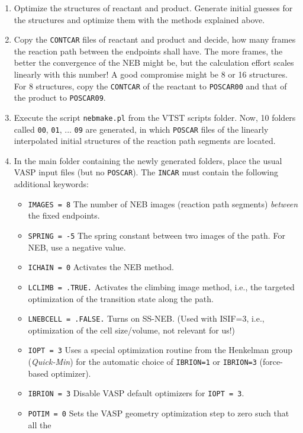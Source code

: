 \documentclass[a4paper,11pt]{article}
\begin{document}
\begin{enumerate}
 \item Optimize the structures of reactant and product. Generate initial guesses for the structures 
 and optimize them with the methods explained above.
 \item Copy the \texttt{CONTCAR} files of reactant and product and decide, how many frames the 
 reaction path between the endpoints shall have. The more frames, the better the convergence of the NEB might be, but the 
 calculation effort scales linearly with this number! A good compromise might be 8 or 16 structures.
 For 8 structures, copy the \texttt{CONTCAR} of the reactant to \texttt{POSCAR00} and that of the product 
 to \texttt{POSCAR09}. 
 \item Execute the script \texttt{nebmake.pl} from the VTST scripts folder. Now, 10 folders called 
 \texttt{00}, \texttt{01}, ... \texttt{09} are generated, in which \texttt{POSCAR} files of the linearly interpolated 
 initial structures of the reaction path segments are located.
 \item In the main folder containing the newly generated folders, place the usual VASP input files 
 (but no \texttt{POSCAR}).
 The \texttt{INCAR} must contain the following additional keywords:
 \begin{itemize}
  \item \texttt{IMAGES = 8} The number of NEB images (reaction path segments) \textit{between} the 
  fixed endpoints.
  \item \texttt{SPRING = -5} The spring constant between two images of the path. For NEB, use 
  a negative value.
  \item \texttt{ICHAIN = 0} Activates the NEB method.
  \item \texttt{LCLIMB = .TRUE.} Activates the climbing image method, i.e., the targeted 
  optimization of the transition state along the path.
  \item \texttt{LNEBCELL = .FALSE.} Turns on SS-NEB. (Used with ISIF=3, i.e., optimization of the 
  cell size/volume, not relevant for us!)
  \item \texttt{IOPT = 3} Uses a special optimization routine from the Henkelman group (\textit{Quick-Min}) for the 
  automatic choice of \texttt{IBRION=1} or \texttt{IBRION=3} (force-based optimizer).
  \item \texttt{IBRION = 3} Disable VASP default optimizers for \texttt{IOPT = 3}.
  \item \texttt{POTIM = 0} Sets the VASP geometry optimization step to zero such that all the 

\end{itemize}
\end{enumerate}
\end{document}
